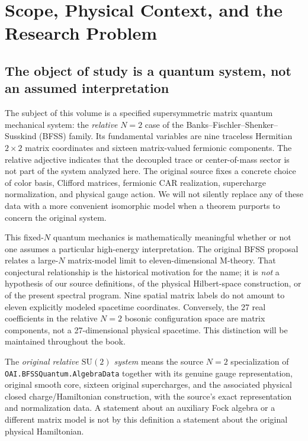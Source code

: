 \chapter{Scope, Physical Context, and the Research Problem}
\label{ch:scope}

\section{The object of study is a quantum system, not an assumed interpretation}

The subject of this volume is a specified supersymmetric matrix quantum
mechanical system: the \emph{relative} $N=2$ case of the Banks--Fischler--Shenker--Susskind
(BFSS) family. Its fundamental variables are nine traceless Hermitian
$2\times2$ matrix coordinates and sixteen matrix-valued fermionic
components. The relative adjective indicates that the decoupled trace or
center-of-mass sector is not part of the system analyzed here. The
original source fixes a concrete choice of color basis, Clifford matrices,
fermionic CAR realization, supercharge normalization, and physical gauge
action. We will not silently replace any of these data with a more convenient
isomorphic model when a theorem purports to concern the original system.

This fixed-$N$ quantum mechanics is mathematically meaningful whether or not
one assumes a particular high-energy interpretation. The original BFSS
proposal relates a large-$N$ matrix-model limit to eleven-dimensional
M-theory. That conjectural relationship is the historical motivation for the
name; it is \emph{not} a hypothesis of our source definitions, of the
physical Hilbert-space construction, or of the present spectral program.
Nine spatial matrix labels do not amount to eleven explicitly modeled
spacetime coordinates. Conversely, the 27 real coefficients in the
relative $N=2$ bosonic configuration space are matrix components, not a
27-dimensional physical spacetime. This distinction will be maintained
throughout the book.

\begin{definition}
\label{def:research-target}
The \emph{original relative $\mathrm{SU}(2)$ system} means the source
$N=2$ specialization of \texttt{OAI.BFSSQuantum.AlgebraData} together with
its genuine gauge representation, original smooth core, sixteen original
supercharges, and the associated physical closed charge/Hamiltonian
construction, with the source's exact representation and normalization data.
A statement about an auxiliary Fock algebra or a different matrix model is
not by this definition a statement about the original physical Hamiltonian.
\end{definition}


